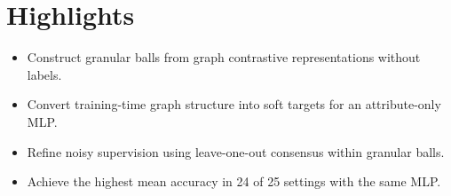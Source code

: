 \documentclass[10pt]{article}
\begin{document}
\section*{Highlights}
\begin{itemize}
\item Construct granular balls from graph contrastive representations without labels.
\item Convert training-time graph structure into soft targets for an attribute-only MLP.
\item Refine noisy supervision using leave-one-out consensus within granular balls.
\item Achieve the highest mean accuracy in 24 of 25 settings with the same MLP.
\end{itemize}
\end{document}
